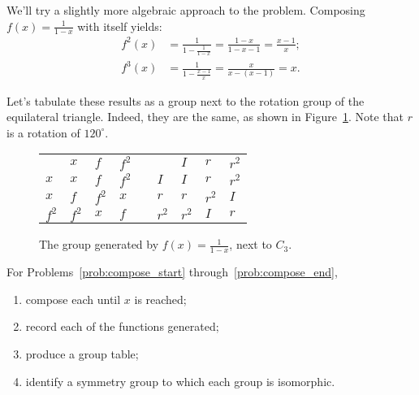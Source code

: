 \documentclass[../gatm.tex]{subfiles}
\begin{document}
We'll try a slightly more algebraic approach to the problem. Composing $f(x)=\frac{1}{1-x}$ with itself yields:
\begin{align*}
f^2(x)&=\frac{1}{1-\frac{1}{1-x}}=\frac{1-x}{1-x-1}=\frac{x-1}{x}; \\
f^3(x)&=\frac{1}{1-\frac{x-1}{x}}=\frac{x}{x-(x-1)}=x.
\end{align*}

Let's tabulate these results as a group next to the rotation group of the equilateral triangle. Indeed, they are the same, as shown in Figure~\ref{fig:vs_cyclic_3}. Note that $r$ is a rotation of $120^\circ$.

\begin{figure}[h]
\begin{center}
\begin{tabular}{|l|l|l|l|l|l|l|l|l|}
\cline{1-4} \cline{6-9}
    & $x$   & $f$   & $f^2$ &  &     & $I$   & $r$   & $r^2$ \\ \cline{1-4} \cline{6-9} 
$x$   & $x$   & $f$   & $f^2$ &  & $I$   & $I$   & $r$   & $r^2$ \\ \cline{1-4} \cline{6-9} 
$x$   & $f$   & $f^2$ & $x$   &  & $r$   & $r$   & $r^2$ & $I$   \\ \cline{1-4} \cline{6-9} 
$f^2$ & $f^2$ & $x$   & $f$   &  & $r^2$ & $r^2$ & $I$   & $r$   \\ \cline{1-4} \cline{6-9} 
\end{tabular}
\end{center}
\caption{The group generated by $f(x)=\frac{1}{1-x}$, next to $C_3$.}
\label{fig:vs_cyclic_3}
\end{figure}

For Problems~\ref{prob:compose_start} through~\ref{prob:compose_end},
\begin{enumerate}[label=\roman*.]
\item compose each until $x$ is reached;
\item record each of the functions generated;
\item produce a group table;
\item identify a symmetry group to which each group is isomorphic.
\end{enumerate}
\end{document}

